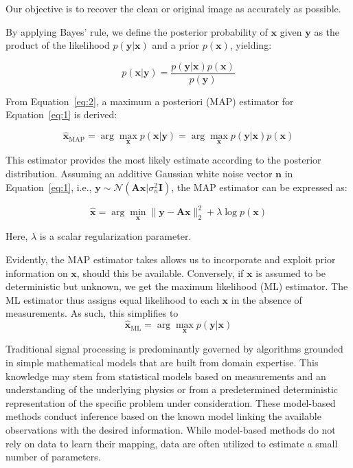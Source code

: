 Our objective is to recover the clean or original image as accurately as possible.

By applying Bayes’ rule, we define the posterior probability of $\mathbf{x}$ given $\mathbf{y}$ as the product of the likelihood $p(\mathbf{y|x})$ and a prior $p(\mathbf{x})$, yielding:

\begin{equation}
    p(\mathbf{x|y}) = \frac{p(\mathbf{y|x})p(\mathbf{x})}{p(\mathbf{y})} \label{eq:2}
\end{equation}

From Equation~\eqref{eq:2}, a maximum a posteriori (MAP) estimator for Equation~\eqref{eq:1} is derived:

\begin{equation}
    \hat{\mathbf{x}}_{\text{MAP}} = \arg\max_{\mathbf{x}} p(\mathbf{x|y}) = \arg\max_{\mathbf{x}} p(\mathbf{y|x})p(\mathbf{x}) \label{eq:4}
\end{equation}

This estimator provides the most likely estimate according to the posterior distribution. Assuming an additive Gaussian white noise vector $\mathbf{n}$ in Equation~\eqref{eq:1}, i.e., $\mathbf{y} \sim \mathcal{N}(\mathbf{Ax}|\sigma^2_n\mathbf{I})$, the MAP estimator can be expressed as:

\begin{equation}
    \hat{\mathbf{x}} = \arg\min_{\mathbf{x}} \|\mathbf{y} - \mathbf{Ax}\|_2^2 + \lambda \log p(\mathbf{x}) \label{eq:5}
\end{equation}

Here, $\lambda$ is a scalar regularization parameter.


Evidently, the MAP estimator takes allows us to incorporate and exploit prior information on \( \mathbf{x} \), should this be available. Conversely, if \( \mathbf{x} \) is assumed to be deterministic but unknown, we get the maximum likelihood (ML) estimator. The ML estimator thus assigns equal likelihood to each \( \mathbf{x} \) in the absence of measurements. As such, this simplifies to
\begin{equation}
    \hat{\mathbf{x}}_{\text{ML}} = \arg\max_\mathbf{x} p(\mathbf{y}|\mathbf{x}) \label{eq:6}
\end{equation}

Traditional signal processing is predominantly governed by algorithms grounded in simple mathematical models that are built from domain expertise. This knowledge may stem from statistical models based on measurements and an understanding of the underlying physics or from a predetermined deterministic representation of the specific problem under consideration. These model-based methods conduct inference based on the known model linking the available observations with the desired information. While model-based methods do not rely on data to learn their mapping, data are often utilized to estimate a small number of parameters.

